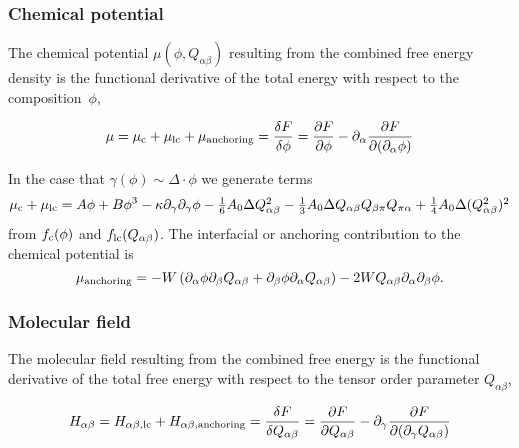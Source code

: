 \subsubsection{Chemical potential}

The chemical potential $\mu(\phi,Q_{\alpha\beta})$ resulting from the
combined free energy density is the functional derivative of the
total energy with respect to the composition~$\phi$, 

\begin{equation}
\mu = \mu_{\rm c} + \mu_{\rm lc} + \mu_{\rm anchoring} = \frac{\delta F}{\delta \phi} 
= \frac{\partial F}{\partial \phi} - \partial_\alpha \frac{\partial F}{\partial (\partial_\alpha \phi)}  
\end{equation}

In the
case that $\gamma(\phi) \sim \Delta\cdot\phi$ we generate terms
\begin{equation}
\mu_{\rm c} + \mu_{\rm lc} = A\phi + B\phi^3 -\kappa \partial_{\gamma}\partial_{\gamma}\phi
- \textstyle{\frac{1}{6}} A_0 \Delta Q_{\alpha\beta}^2
- \textstyle{\frac{1}{3}} A_0 \Delta
                          Q_{\alpha\beta} Q_{\beta\pi} Q_{\pi\alpha}
+ \textstyle{\frac{1}{4}} A_0 \Delta (Q_{\alpha\beta}^2)^2
\end{equation}
from $f_{\rm c}(\phi)$ and $f_{\rm lc}(Q_{\alpha\beta})$.
The interfacial or anchoring contribution to the chemical potential is
\begin{equation} 
\mu_{\rm anchoring}=-W \left(
 \partial_{\alpha}\phi\partial_{\beta}Q_{\alpha\beta}
+\partial_{\beta}\phi\partial_{\alpha}Q_{\alpha\beta}\right)
- 2W Q_{\alpha\beta} \partial_\alpha\partial_\beta\phi.
\end{equation}

\subsubsection{Molecular field}

The molecular field resulting from the combined free energy is the functional
derivative of the total free energy with respect to the tensor order parameter $Q_{\alpha\beta}$,

\begin{equation}
H_{\alpha\beta} = H_{\alpha\beta,{\rm lc}} + H_{\alpha\beta, {\rm anchoring}}  = \frac{\delta F}{\delta Q_{\alpha\beta}} 
= \frac{\partial F}{\partial Q_{\alpha\beta}} - \partial_\gamma \frac{\partial F}{\partial (\partial_\gamma Q_{\alpha\beta})}  
\end{equation}

